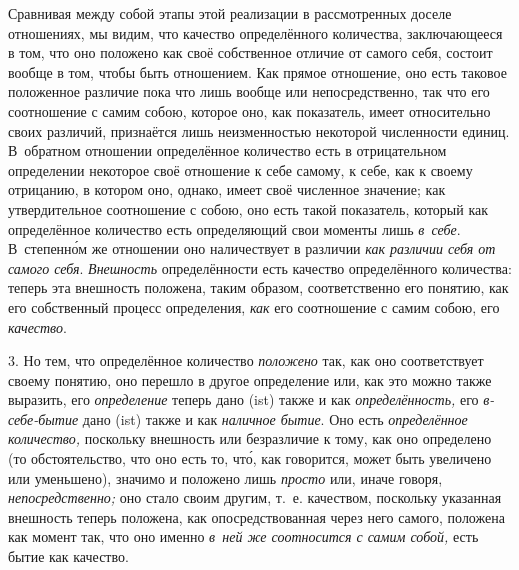 Сравнивая между собой этапы этой реализации в рассмотренных доселе отношениях,
мы видим, что качество определённого количества, заключающееся в том, что оно
положено как своё собственное отличие от самого себя, состоит вообще в том,
чтобы быть отношением. Как прямое отношение, оно есть таковое положенное
различие пока что лишь вообще или непосредственно, так что его соотношение с
самим собою, которое оно, как показатель, имеет относительно своих различий,
признаётся лишь неизменностью некоторой численности единиц. В~обратном
отношении определённое количество есть в отрицательном определении некоторое
своё отношение к себе самому, к себе, как к своему отрицанию, в котором оно,
однако, имеет своё численное значение; как утвердительное соотношение с собою,
оно есть такой показатель, который как определённое количество есть
определяющий свои моменты лишь {\em в~себе}. В~степенн\'{о}м же отношении оно
наличествует в различии {\em как различии себя от самого себя}. {\em Внешность}
определённости есть качество определённого количества: теперь эта внешность
положена, таким образом, соответственно его понятию, как его собственный
процесс определения, {\em как} его соотношение с самим собою, его
{\em качество}.

3. Но тем, что определённое количество {\em положено} так, как оно
соответствует своему понятию, оно перешло в другое определение или, как это
можно также выразить, его {\em определение} теперь дано (ist) также и как
{\em определённость,} его {\em в-себе-бытие} дано (ist) также и как
{\em наличное бытие}. Оно есть {\em определённое количество,} поскольку
внешность или безразличие к тому, как оно определено (то обстоятельство, что
оно есть то, чт\'{о}, как говорится, может быть увеличено или уменьшено),
значимо и положено лишь {\em просто} или, иначе говоря, {\em непосредственно;}
оно стало своим другим, т.~е. качеством, поскольку указанная внешность теперь
положена, как опосредствованная через него самого, положена как момент так, что
оно именно {\em в~ней же соотносится с самим собой,} есть бытие как качество.

